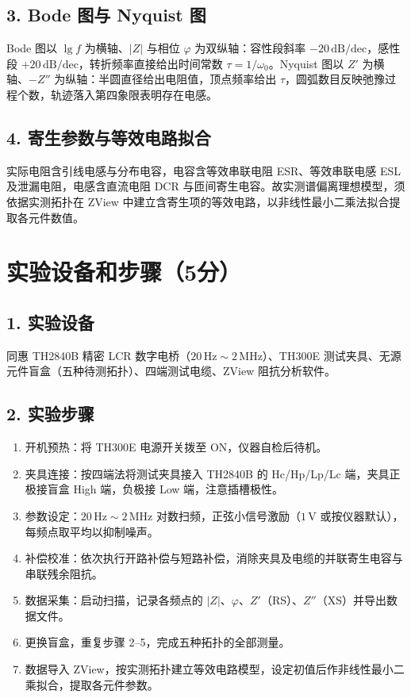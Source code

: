 \documentclass[12pt,a4paper]{ctexart}
\begin{document}
\subsection*{3. Bode 图与 Nyquist 图}
Bode 图以 $\lg f$ 为横轴、$|Z|$ 与相位 $\varphi$ 为双纵轴：容性段斜率 $-20\,\mathrm{dB/dec}$，感性段 $+20\,\mathrm{dB/dec}$，转折频率直接给出时间常数 $\tau=1/\omega_0$。Nyquist 图以 $Z'$ 为横轴、$-Z''$ 为纵轴：半圆直径给出电阻值，顶点频率给出 $\tau$，圆弧数目反映弛豫过程个数，轨迹落入第四象限表明存在电感。

\subsection*{4. 寄生参数与等效电路拟合}
实际电阻含引线电感与分布电容，电容含等效串联电阻 ESR、等效串联电感 ESL 及泄漏电阻，电感含直流电阻 DCR 与匝间寄生电容。故实测谱偏离理想模型，须依据实测拓扑在 ZView 中建立含寄生项的等效电路，以非线性最小二乘法拟合提取各元件数值。

\section*{实验设备和步骤（5分）}

\subsection*{1. 实验设备}
同惠 TH2840B 精密 LCR 数字电桥（$20\,\mathrm{Hz}\sim2\,\mathrm{MHz}$）、TH300E 测试夹具、无源元件盲盒（五种待测拓扑）、四端测试电缆、ZView 阻抗分析软件。

\subsection*{2. 实验步骤}
\begin{enumerate}
    \item 开机预热：将 TH300E 电源开关拨至 ON，仪器自检后待机。
    \item 夹具连接：按四端法将测试夹具接入 TH2840B 的 Hc/Hp/Lp/Lc 端，夹具正极接盲盒 High 端，负极接 Low 端，注意插槽极性。
    \item 参数设定：$20\,\mathrm{Hz}\sim2\,\mathrm{MHz}$ 对数扫频，正弦小信号激励（$1\,\mathrm{V}$ 或按仪器默认），每频点取平均以抑制噪声。
    \item 补偿校准：依次执行开路补偿与短路补偿，消除夹具及电缆的并联寄生电容与串联残余阻抗。
    \item 数据采集：启动扫描，记录各频点的 $|Z|$、$\varphi$、$Z'$（RS）、$Z''$（XS）并导出数据文件。
    \item 更换盲盒，重复步骤 2--5，完成五种拓扑的全部测量。
    \item 数据导入 ZView，按实测拓扑建立等效电路模型，设定初值后作非线性最小二乘拟合，提取各元件参数。
\end{enumerate}
\end{document}
